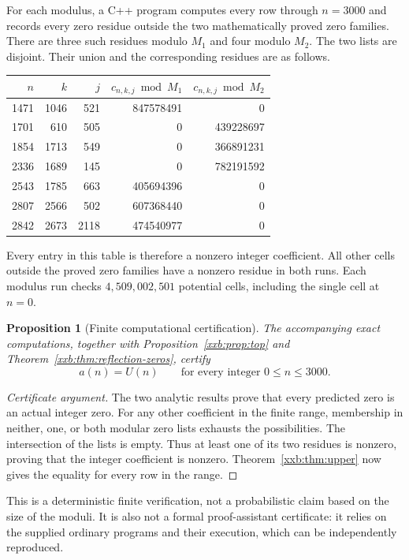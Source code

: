 \documentclass[11pt,a4paper]{article}
\numberwithin{equation}{section}
\newtheorem{proposition}[theorem]{Proposition}
\theoremstyle{definition}
\theoremstyle{remark}
\theoremstyle{plain}
\newcommand{\U}{U}
\begin{document}
For each modulus, a C++ program computes every row through $n=3000$ and
records every zero residue outside the two mathematically proved zero
families. There are three such residues modulo $M_1$ and four modulo
$M_2$. The two lists are disjoint. Their union and the corresponding
residues are as follows.
\begin{center}
\small
\begin{tabular}{rrr|rr}
\toprule
$n$ & $k$ & $j$ & $c_{n,k,j}\bmod M_1$ & $c_{n,k,j}\bmod M_2$\\
\midrule
1471&1046&521&847578491&0\\
1701&610&505&0&439228697\\
1854&1713&549&0&366891231\\
2336&1689&145&0&782191592\\
2543&1785&663&405694396&0\\
2807&2566&502&607368440&0\\
2842&2673&2118&474540977&0\\
\bottomrule
\end{tabular}
\end{center}
Every entry in this table is therefore a nonzero integer coefficient.
All other cells outside the proved zero families have a nonzero residue
in both runs. Each modulus run checks $4{,}509{,}002{,}501$ potential
cells, including the single cell at $n=0$.

\begin{proposition}[Finite computational certification]\label{xxb:prop:finite}
The accompanying exact computations, together with
Proposition~\ref{xxb:prop:top} and Theorem~\ref{xxb:thm:reflection-zeros}, certify
\begin{equation}\label{xxb:eq:finite}
 a(n)=\U(n)\qquad\text{for every integer }0\le n\le3000.
\end{equation}
\end{proposition}
\begin{proof}[Certificate argument]
The two analytic results prove that every predicted zero is an actual
integer zero. For any other coefficient in the finite range, membership
in neither, one, or both modular zero lists exhausts the possibilities.
The intersection of the lists is empty. Thus at least one of its two
residues is nonzero, proving that the integer coefficient is nonzero.
Theorem~\ref{xxb:thm:upper} now gives the equality for every row in the range.
\end{proof}
This is a deterministic finite verification, not a probabilistic claim
based on the size of the moduli. It is also not a formal proof-assistant
certificate: it relies on the supplied ordinary programs and their
execution, which can be independently reproduced.
\end{document}

